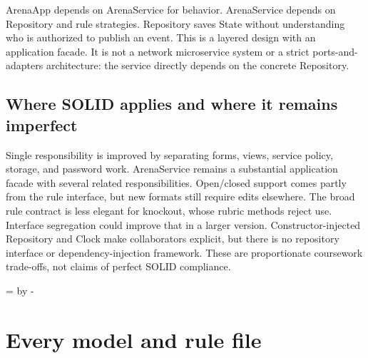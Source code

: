 \documentclass[12pt]{article}
\newcommand{\topic}[1]{\needroom{9\baselineskip}\section{#1}}
\newcommand{\needroom}[1]{\par\begingroup\dimen0=\pagegoal\advance\dimen0 by -\pagetotal\ifdim\dimen0<#1\newpage\fi\endgroup}
\begin{document}
ArenaApp depends on ArenaService for behavior. ArenaService depends on Repository and rule strategies. Repository saves State without understanding who is authorized to publish an event. This is a layered design with an application facade. It is not a network microservice system or a strict ports-and-adapters architecture: the service directly depends on the concrete Repository.

\subsection{Where SOLID applies and where it remains imperfect}
Single responsibility is improved by separating forms, views, service policy, storage, and password work. ArenaService remains a substantial application facade with several related responsibilities. Open/closed support comes partly from the rule interface, but new formats still require edits elsewhere. The broad rule contract is less elegant for knockout, whose rubric methods reject use. Interface segregation could improve that in a larger version. Constructor-injected Repository and Clock make collaborators explicit, but there is no repository interface or dependency-injection framework. These are proportionate coursework trade-offs, not claims of perfect SOLID compliance.

\topic{Every model and rule file}
\end{document}
